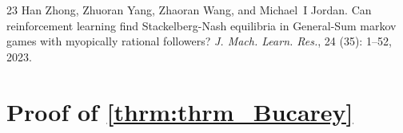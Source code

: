 \documentclass{acml}
\begin{document}
\begin{thebibliography}{23}
Han Zhong, Zhuoran Yang, Zhaoran Wang, and Michael~I Jordan.
\newblock Can reinforcement learning find {Stackelberg-Nash} equilibria in {General-Sum} markov games with myopically rational followers?
\newblock \emph{J. Mach. Learn. Res.}, 24 (35): 1--52, 2023.

\end{thebibliography}



\newpage
\appendix

\section{Proof of \texorpdfstring{\cref{thrm:thrm_Bucarey}}{Lg}}\label{apdx:thrm_Bucarey}
\end{document}
